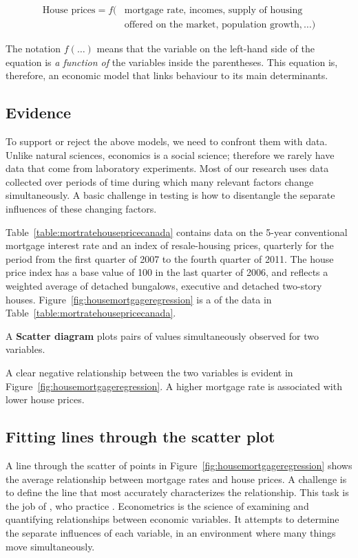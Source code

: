 \begin{align*}
\text{House prices}=f(&\text{mortgage rate, incomes, supply of housing} \\
&\text{offered on the market, population growth},\ldots)
\end{align*}

The notation $f(\ldots)$ means that the variable on the left-hand side of the equation is \textit{a function of} the variables inside the parentheses. This equation is, therefore, an economic model that links behaviour to its main determinants.

\subsection*{Evidence}

To support or reject the above models, we need to confront them with data. Unlike natural sciences, economics is a social science; therefore we rarely have data that come from laboratory experiments. Most of our research uses data collected over periods of time during which many relevant factors change simultaneously. A basic challenge in testing is how to disentangle the separate influences of these changing factors.

Table~\ref{table:mortratehousepricecanada} contains data on the 5-year conventional mortgage interest rate and an index of resale-housing prices, quarterly for the period from the first quarter of 2007 to the fourth quarter of 2011. The house price index has a base value of 100 in the last quarter of 2006, and reflects a weighted average of detached bungalows, executive and detached two-story houses. Figure~\ref{fig:housemortgageregression} is a  of the data in Table~\ref{table:mortratehousepricecanada}.

\begin{DefBox}
A \textbf{Scatter diagram} plots pairs of values simultaneously observed for two variables.
\end{DefBox}

A clear negative relationship between the two variables is evident in Figure~\ref{fig:housemortgageregression}. A higher mortgage rate is associated with lower house prices. 

\subsection*{Fitting lines through the scatter plot}

A line through the scatter of points in Figure~\ref{fig:housemortgageregression} shows the average relationship between mortgage rates and house prices.  A challenge is to define the line that most accurately characterizes the relationship. This task is the job of , who practice . Econometrics is the science of examining and quantifying relationships between economic variables. It attempts to determine the separate influences of each variable, in an environment where many things move simultaneously.

